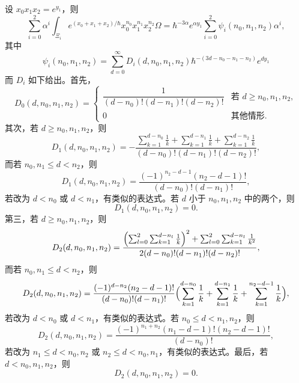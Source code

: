 \begin{lemma}
  设 $x_0x_1x_2=e^{y_1}$，则
  \[
    \sum_{i=0}^2\alpha^i\int_{\Xi_i}e^{(x_0+x_1+x_2)/\hbar}x_0^{n_0}x_1^{n_1}x_2^{n_2}\Omega
    =\hbar^{-3\alpha}e^{\alpha y_1}\sum_{i=0}^2\psi_i(n_0,n_1,n_2)\alpha^i,
  \]
  其中
  \[
    \psi_i(n_0,n_1,n_2)=\sum_{d=0}^{\infty}D_i(d,n_0,n_1,n_2)\hbar^{-(3d-n_0-n_1-n_2)}e^{dy_1}
  \]
  而 $D_i$ 如下给出。首先，
  \[
    D_0(d,n_0,n_1,n_2)=
    \begin{cases}
      \dfrac{1}{(d-n_0)!(d-n_1)!(d-n_2)!} & \text{若 } d\ge n_0,n_1,n_2,\\[2mm]
      0 & \text{其他情形}.
    \end{cases}
  \]
  其次，若 $d\ge n_0,n_1,n_2$，则
  \[
    D_1(d,n_0,n_1,n_2)=-\frac{\sum_{k=1}^{d-n_0}\frac1k+\sum_{k=1}^{d-n_1}\frac1k+\sum_{k=1}^{d-n_2}\frac1k}
    {(d-n_0)!(d-n_1)!(d-n_2)!},
  \]
  而若 $n_0,n_1\le d<n_2$，则
  \[
    D_1(d,n_0,n_1,n_2)=\frac{(-1)^{n_2-d-1}(n_2-d-1)!}{(d-n_0)!(d-n_1)!},
  \]
  若改为 $d<n_0$ 或 $d<n_1$，有类似的表达式。若 $d$ 小于 $n_0,n_1,n_2$ 中的两个，则
  \[
    D_1(d,n_0,n_1,n_2)=0.
  \]
  第三，若 $d\ge n_0,n_1,n_2$，则
  \[
    D_2(d,n_0,n_1,n_2)=\frac{\Bigl(\sum_{l=0}^{2}\sum_{k=1}^{d-n_l}\frac1k\Bigr)^2
    +\sum_{l=0}^{2}\sum_{k=1}^{d-n_l}\frac1{k^2}}{2(d-n_0)!(d-n_1)!(d-n_2)!},
  \]
  而若 $n_0,n_1\le d<n_2$，则
  \[
    D_2(d,n_0,n_1,n_2)=\frac{(-1)^{d-n_2}(n_2-d-1)!}{(d-n_0)!(d-n_1)!}
    \Bigl(\sum_{k=1}^{d-n_0}\frac1k+\sum_{k=1}^{d-n_1}\frac1k+\sum_{k=1}^{n_2-d-1}\frac1k\Bigr),
  \]
  若改为 $d<n_0$ 或 $d<n_1$，有类似的表达式。若 $n_0\le d<n_1,n_2$，则
  \[
    D_2(d,n_0,n_1,n_2)=\frac{(-1)^{n_1+n_2}(n_1-d-1)!(n_2-d-1)!}{(d-n_0)!},
  \]
  若改为 $n_1\le d<n_0,n_2$ 或 $n_2\le d<n_0,n_1$，有类似的表达式。最后，若 $d<n_0,n_1,n_2$，则
  \[
    D_2(d,n_0,n_1,n_2)=0.
  \]
\end{lemma}

